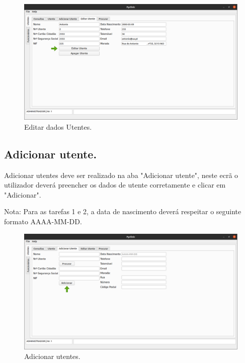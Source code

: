 \documentclass[11pt,a4paper,twoside]{article}
\begin{document}
\begin{figure}[H]
	\centering
	\includegraphics[width=0.9\linewidth]{image/rececionista/editarUtente.png}
	\caption{Editar dados Utentes.}
	\label{fig:editarutente}
\end{figure}

\subsection{Adicionar utente.}
Adicionar utentes deve ser realizado na aba "Adicionar utente", neste ecrã o utilizador deverá preencher os dados de utente corretamente e clicar em "Adicionar". 

Nota: Para as tarefas 1 e 2, a data de nascimento deverá respeitar o seguinte formato AAAA-MM-DD.

\begin{figure}[H]
	\centering
	\includegraphics[width=0.9\linewidth]{image/rececionista/adicionarutente.png}
	\caption{Adicionar utentes.}
	\label{fig:adicionarutente}
\end{figure}

\end{document}
